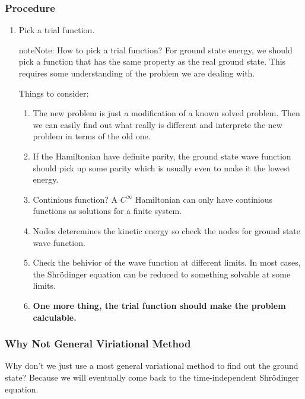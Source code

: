 \documentclass[letterpaper,10pt,english]{sphinxmanual}
\begin{document}
\subsubsection{Procedure}
\label{approx:procedure}\begin{enumerate}
\item {} 
Pick a trial function.

\begin{notice}{note}{Note:}
How to pick a trial function? For ground state energy, we should pick a function that has the same property as the real ground state. This requires some understanding of the problem we are dealing with.

Things to consider:
\begin{enumerate}
\item {} 
The new problem is just a modification of a known solved problem. Then we can easily find out what really is different and interprete the new problem in terms of the old one.

\item {} 
If the Hamiltonian have definite parity, the ground state wave function should pick up some parity which is usually even to make it the lowest energy.

\item {} 
Continious function? A $C^\infty$ Hamiltonian can only have continious functions as solutions for a finite system.

\item {} 
Nodes deteremines the kinetic energy so check the nodes for ground state wave function.

\item {} 
Check the behivior of the wave function at different limits. In most cases, the Shrödinger equation can be reduced to something solvable at some limits.

\item {} 
\textbf{One more thing, the trial function should make the problem calculable.}

\end{enumerate}
\end{notice}

\end{enumerate}


\subsubsection{Why Not General Viriational Method}
\label{approx:why-not-general-viriational-method}
Why don't we just use a most general variational method to find out the ground state? Because we will eventually come back to the time-independent Shrödinger equation.
\end{document}
